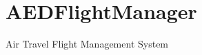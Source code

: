 \chapter{AEDFlight\+Manager}
\hypertarget{index}{}\label{index}
\label{index_md__2_users_2antonioabilio_2_c_lion_projects_2_a_e_d_flight_manager_2_r_e_a_d_m_e}%
%
Air Travel Flight Management System 